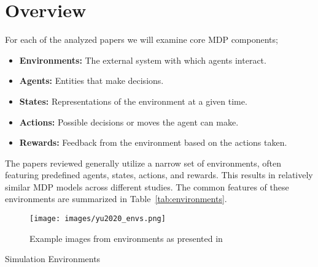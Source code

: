 \documentclass[journal]{IEEEtran}
\begin{document}
\section{Overview}
\label{sec:overview}

For each of the analyzed papers we will examine core MDP components;

\begin{itemize}
    \item \textbf{Environments:} The external system with which agents interact.
    \item \textbf{Agents:} Entities that make decisions.
    \item \textbf{States:} Representations of the environment at a given time.
    \item \textbf{Actions:} Possible decisions or moves the agent can make.
    \item \textbf{Rewards:} Feedback from the environment based on the actions taken.
\end{itemize}

The papers reviewed generally utilize a narrow set of environments, 
often featuring predefined agents, states, actions, and rewards. 
This results in relatively similar MDP models across different studies. 
The common features of these environments are summarized in Table~\ref{tab:environments}.

\begin{figure}
    \texttt{[image: images/yu2020\_envs.png]}
    \caption{Example images from environments as presented in~\cite{yu2022}}
\end{figure}

\begin{table*}
    \caption[]{Simulation Environments}
    \label{tab:environments}
    \renewcommand{\arraystretch}{1.25}
\end{table*}
\end{document}
